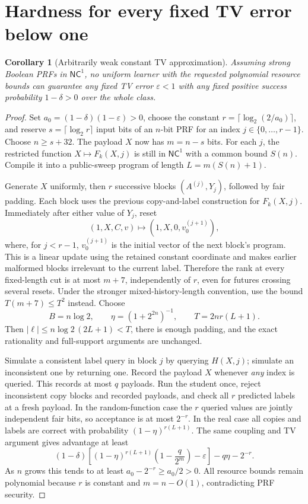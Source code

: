 \documentclass[11pt]{article}
\newcommand{\NC}{\mathsf{NC}^{1}}
\newtheorem{corollary}[theorem]{Corollary}
\theoremstyle{definition}
\theoremstyle{remark}
\begin{document}
\section{Hardness for every fixed TV error below one}\label{sec:weak-error}

\begin{corollary}[Arbitrarily weak constant TV approximation]\label{cor:allTV}
Assuming strong Boolean PRFs in $\NC$, no uniform learner with the requested polynomial resource bounds can guarantee any fixed TV error $\varepsilon<1$ with any fixed positive success probability $1-\delta>0$ over the whole class.
\end{corollary}
\begin{proof}
Set $a_0=(1-\delta)(1-\varepsilon)>0$, choose the constant
$r=\lceil\log_2(2/a_0)\rceil$, and reserve $s=\lceil\log_2 r\rceil$ input bits of an $n$-bit PRF for an index $j\in\{0,\ldots,r-1\}$. Choose $n\ge s+32$. The payload $X$ now has $m=n-s$ bits. For each $j$, the restricted function $X\mapsto F_k(X,j)$ is still in $\NC$ with a common bound $S(n)$. Compile it into a public-sweep program of length $L=m(S(n)+1)$.

Generate $X$ uniformly, then $r$ successive blocks $(A^{(j)},Y_j)$, followed by fair padding. Each block uses the previous copy-and-label construction for $F_k(X,j)$. Immediately after either value of $Y_j$, reset
\[
(1,X,C,v)\longmapsto(1,X,0,v_0^{(j+1)}),
\]
where, for $j<r-1$, $v_0^{(j+1)}$ is the initial vector of the next block's program.
This is a linear update using the retained constant coordinate and makes earlier malformed blocks irrelevant to the current label. Therefore the rank at every fixed-length cut is at most $m+7$, independently of $r$, even for futures crossing several resets. Under the stronger mixed-history-length convention, use the bound $T(m+7)\le T^2$ instead. Choose
\[
B=n\log2,\qquad \eta=(1+2^{2n})^{-1},\qquad T=2nr(L+1).
\]
Then $|\ell|\le n\log2\,(2L+1)<T$, there is enough padding, and the exact rationality and full-support arguments are unchanged.

Simulate a consistent label query in block $j$ by querying $H(X,j)$; simulate an inconsistent one by returning one. Record the payload $X$ whenever \emph{any} index is queried. This records at most $q$ payloads. Run the student once, reject inconsistent copy blocks and recorded payloads, and check all $r$ predicted labels at a fresh payload. In the random-function case the $r$ queried values are jointly independent fair bits, so acceptance is at most $2^{-r}$. In the real case all copies and labels are correct with probability $(1-\eta)^{r(L+1)}$. The same coupling and TV argument gives advantage at least
\[
(1-\delta)\left[(1-\eta)^{r(L+1)}
\left(1-\frac{q}{2^m}\right)-\varepsilon\right]-q\eta-2^{-r}.
\]
As $n$ grows this tends to at least $a_0-2^{-r}\ge a_0/2>0$. All resource bounds remain polynomial because $r$ is constant and $m=n-O(1)$, contradicting PRF security.
\end{proof}
\end{document}
